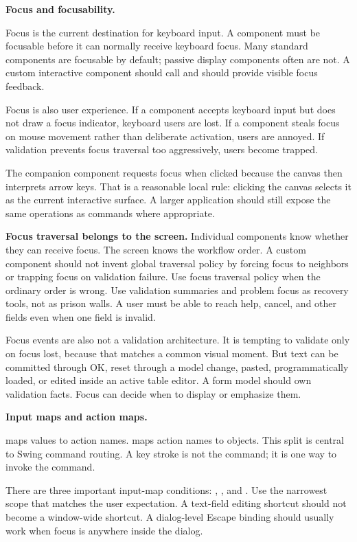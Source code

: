 \textbf{Focus and focusability.}

Focus is the current destination for keyboard input. A component must be focusable before it can normally receive keyboard focus. Many standard components are focusable by default; passive display components often are not. A custom interactive component should call  and should provide visible focus feedback.

Focus is also user experience. If a component accepts keyboard input but does not draw a focus indicator, keyboard users are lost. If a component steals focus on mouse movement rather than deliberate activation, users are annoyed. If validation prevents focus traversal too aggressively, users become trapped.

The companion component requests focus when clicked because the canvas then interprets arrow keys. That is a reasonable local rule: clicking the canvas selects it as the current interactive surface. A larger application should still expose the same operations as commands where appropriate.

\textbf{Focus traversal belongs to the screen.} Individual components know whether they can receive focus. The screen knows the
workflow order. A custom component should not invent global traversal policy by
forcing focus to neighbors or trapping focus on validation failure. Use focus
traversal policy when the ordinary order is wrong. Use validation summaries and
problem focus as recovery tools, not as prison walls. A user must be able to
reach help, cancel, and other fields even when one field is invalid.

Focus events are also not a validation architecture. It is tempting to validate
only on focus lost, because that matches a common visual moment. But text can be
committed through OK, reset through a model change, pasted, programmatically
loaded, or edited inside an active table editor. A form model should own
validation facts. Focus can decide when to display or emphasize them.

\textbf{Input maps and action maps.}

 maps  values to action names.  maps action names to  objects. This split is central to Swing command routing. A key stroke is not the command; it is one way to invoke the command.

There are three important input-map conditions: , , and . Use the narrowest scope that matches the user expectation. A text-field editing shortcut should not become a window-wide shortcut. A dialog-level Escape binding should usually work when focus is anywhere inside the dialog.

